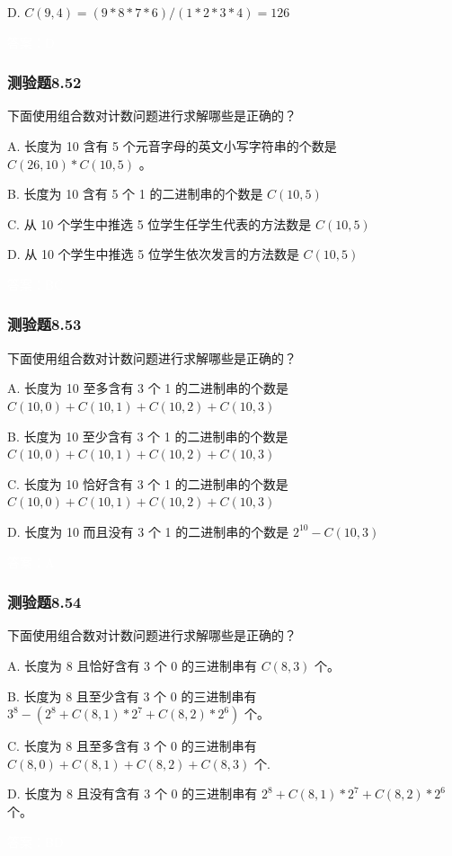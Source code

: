 \documentclass[UTF8, heading=true]{ctexart}
\begin{document}
D. $C(9,4)=\left(9 * 8 * 7 * 6\right) /(1 * 2 * 3 * 4)=126$

\textcolor{white}{答案：D}

\subsubsection{测验题8.52}
下面使用组合数对计数问题进行求解哪些是正确的？

A. 长度为 10 含有 5 个元音字母的英文小写字符串的个数是 $C(26,10) * C(10,5)$ 。

B. 长度为 10 含有 5 个 1 的二进制串的个数是 $C(10,5)$

C. 从 10 个学生中推选 5 位学生任学生代表的方法数是 $C(10,5)$

D. 从 10 个学生中推选 5 位学生依次发言的方法数是 $C(10,5)$

\textcolor{white}{答案：BC}

\subsubsection{测验题8.53}

下面使用组合数对计数问题进行求解哪些是正确的？

A. 长度为 10 至多含有 3 个 1 的二进制串的个数是 $C(10,0)+C(10,1)+C(10,2)+C(10,3)$

B. 长度为 10 至少含有 3 个 1 的二进制串的个数是 $C(10,0)+C(10,1)+C(10,2)+C(10,3)$

C. 长度为 10 恰好含有 3 个 1 的二进制串的个数是 $C(10,0)+C(10,1)+C(10,2)+C(10,3)$

D. 长度为 10 而且没有 3 个 1 的二进制串的个数是 $2^{10}-C(10,3)$

\textcolor{white}{答案：A}

\subsubsection{测验题8.54}
下面使用组合数对计数问题进行求解哪些是正确的？

A. 长度为 8 且恰好含有 3 个 0 的三进制串有 $C(8,3)$ 个。

B. 长度为 8 且至少含有 3 个 0 的三进制串有 $3^8-\left(2^8+C(8,1) * 2^7+C(8,2) * 2^6\right)$ 个。

C. 长度为 8 且至多含有 3 个 0 的三进制串有 $C(8,0)+C(8,1)+C(8,2)+C(8,3)$ 个.

D. 长度为 8 且没有含有 3 个 0 的三进制串有 $2^8+C(8,1) * 2^7+C(8,2) * 2^6$ 个。

\textcolor{white}{答案：BD}
\end{document}
